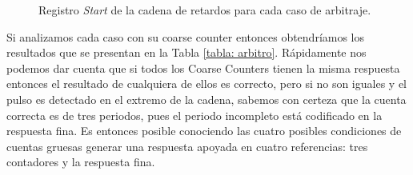 \begin{figure}[H]
      \caption{Registro \textit{Start} de la cadena de retardos para cada caso de arbitraje.}
      \label{fig: finos_casos_start}
\end{figure}

Si analizamos cada caso con su coarse counter entonces obtendríamos los resultados que se presentan en la Tabla \ref{tabla: arbitro}.
Rápidamente nos podemos dar cuenta que si todos los Coarse Counters tienen la misma respuesta entonces el resultado de cualquiera de ellos es correcto,
pero si no son iguales y el pulso es detectado en el extremo de la cadena, sabemos con certeza que la cuenta correcta es de tres periodos,
pues el periodo incompleto está codificado en la respuesta fina. Es entonces posible conociendo las cuatro posibles condiciones de cuentas gruesas generar 
una respuesta apoyada en cuatro referencias: tres contadores y la respuesta fina.

